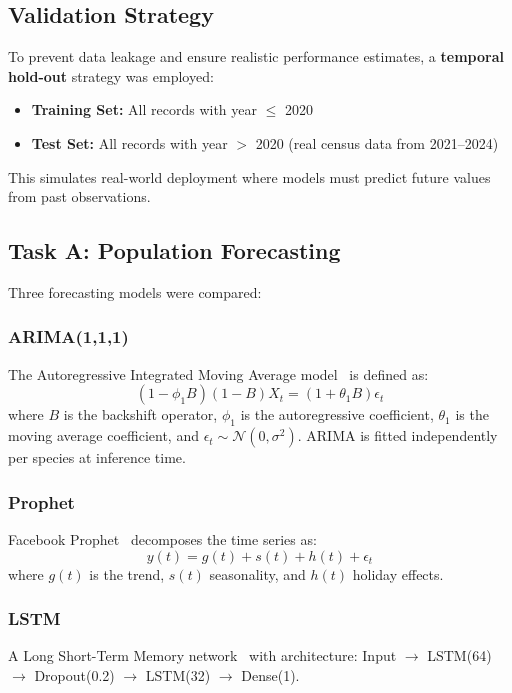 \documentclass[conference]{IEEEtran}
\begin{document}
\subsection{Validation Strategy}
To prevent data leakage and ensure realistic performance estimates, a \textbf{temporal hold-out} strategy was employed:
\begin{itemize}
\item \textbf{Training Set:} All records with year $\leq$ 2020
\item \textbf{Test Set:} All records with year $>$ 2020 (real census data from 2021--2024)
\end{itemize}
This simulates real-world deployment where models must predict future values from past observations.

\subsection{Task A: Population Forecasting}
Three forecasting models were compared:

\subsubsection{ARIMA(1,1,1)}
The Autoregressive Integrated Moving Average model~\cite{box2015} is defined as:
\begin{equation}
(1 - \phi_1 B)(1 - B) X_t = (1 + \theta_1 B) \epsilon_t
\end{equation}
where $B$ is the backshift operator, $\phi_1$ is the autoregressive coefficient, $\theta_1$ is the moving average coefficient, and $\epsilon_t \sim \mathcal{N}(0, \sigma^2)$. ARIMA is fitted independently per species at inference time.

\subsubsection{Prophet}
Facebook Prophet~\cite{taylor2018} decomposes the time series as:
\begin{equation}
y(t) = g(t) + s(t) + h(t) + \epsilon_t
\end{equation}
where $g(t)$ is the trend, $s(t)$ seasonality, and $h(t)$ holiday effects.

\subsubsection{LSTM}
A Long Short-Term Memory network~\cite{hochreiter1997} with architecture: Input $\rightarrow$ LSTM(64) $\rightarrow$ Dropout(0.2) $\rightarrow$ LSTM(32) $\rightarrow$ Dense(1).
\end{document}
